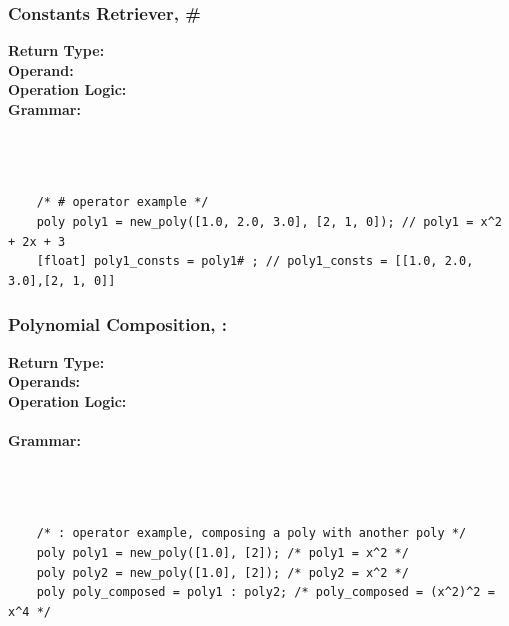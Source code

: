 \documentclass{article}
\begin{document}
    \subsubsection{Constants Retriever, \#}
    \textbf{Return Type:}\text{ [ float ]}\\
    \textbf{Operand:}\\
    \textbf{Operation Logic:}\\
    \textbf{Grammar:}\\
    \\
    \\
    \\
    \begin{lstlisting}
    /* # operator example */
    poly poly1 = new_poly([1.0, 2.0, 3.0], [2, 1, 0]); // poly1 = x^2 + 2x + 3
    [float] poly1_consts = poly1# ; // poly1_consts = [[1.0, 2.0, 3.0],[2, 1, 0]]
    \end{lstlisting}
    
    \subsubsection{Polynomial Composition, :}
    \textbf{Return Type:}\\
    \textbf{Operands:}\\
    \textbf{Operation Logic:}\\
    \\
    \textbf{Grammar:}\\
    \\
    \\
    \\
    \begin{lstlisting}
    /* : operator example, composing a poly with another poly */
    poly poly1 = new_poly([1.0], [2]); /* poly1 = x^2 */
    poly poly2 = new_poly([1.0], [2]); /* poly2 = x^2 */
    poly poly_composed = poly1 : poly2; /* poly_composed = (x^2)^2 = x^4 */
    \end{lstlisting}
    
\end{document}
